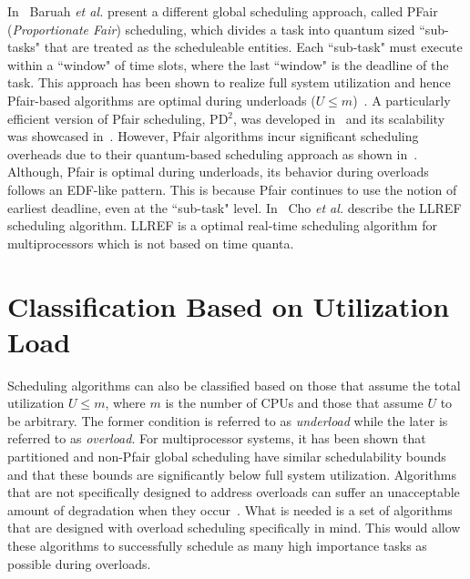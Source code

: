 \documentclass[12pt,dvips]{report}
\begin{document}
In~\cite{pfair1,pfair2} Baruah \textit{et al.} present a different global scheduling approach, called PFair~\cite{pfair1} (\textit{Proportionate Fair}) scheduling, which divides a task into quantum sized ``sub-tasks" that are treated as the scheduleable entities. Each ``sub-task" must execute within a ``window" of time slots, where the last ``window" is the deadline of the task. This approach has been shown to realize full system utilization and hence Pfair-based algorithms are optimal during underloads ($U \le m$)~\cite{pfair1,pfair2}. A particularly efficient version of Pfair scheduling, PD$^2$, was developed in~\cite{pfair_anderson} and its scalability was showcased in~\cite{scalabilitypfair}. However, Pfair algorithms incur significant scheduling overheads due to their quantum-based scheduling approach as shown in~\cite{devi_tardiness}. Although, Pfair is optimal during underloads, its behavior during overloads follows an EDF-like pattern. This is because Pfair continues to use the notion of earliest deadline, even at the ``sub-task" level. In~\cite{cho_llref} Cho \textit{et al.} describe the LLREF scheduling algorithm. LLREF is a optimal real-time scheduling algorithm for multiprocessors which is not based on time quanta. 


\section{Classification Based on Utilization Load}\label{sec:util-load}

Scheduling algorithms can also be classified based on those that assume the total utilization $U \le m$, where $m$ is the number of CPUs and those that assume $U$ to be arbitrary. The former condition is referred to as \textit{underload} while the later is referred to as \textit{overload}. For multiprocessor systems, it has been shown that partitioned and non-Pfair global scheduling have similar schedulability bounds~\cite{Carpenter04acategorization} and that these bounds are significantly below full system utilization. Algorithms that are not specifically designed to address overloads can suffer an unacceptable amount of degradation when they occur~\cite{uniprocessor_overloads,MOCA}. What is needed is a set of algorithms that are designed with overload scheduling specifically in mind. This would allow these algorithms to successfully schedule as many high importance tasks as possible during overloads.
\end{document}
